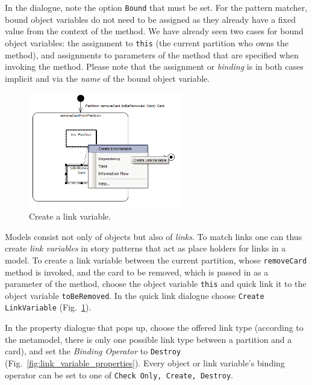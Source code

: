In the dialogue, note the option \texttt{Bound} that must be set.
For the pattern matcher, bound object variables do not need to be assigned as they already have a fixed value from the context of the method.  
We have already seen two cases  for bound object variables: the assignment to \texttt{this} (the current  partition who owns the method), and assignments to parameters of the 
method that  are specified when invoking the method.  
Please note that the assignment or \emph{binding} is in both cases implicit and via the \emph{name} of the bound object variable. 

\begin{figure}[htp]
\begin{center}
  \includegraphics[width=0.6\textwidth]{pics/sdmBilder/removeCard/sdm11RAW}
  \caption{Create a link variable.}   
  \label{fig:link_variable}
\end{center}
\end{figure}

Models consist not only of objects but also of \emph{links}.  
To match links one can thus create \emph{link variables} in story patterns that act as place 
holders for links in a model.  
To create a link variable between the current partition, whose \texttt{removeCard} method is invoked, and the card to be removed, which is passed in as a parameter of the method, choose the object variable \texttt{this} and quick link it to the object variable \texttt{toBeRemoved}.  
In the quick link dialogue choose \texttt{Create LinkVariable} (Fig.~\ref{fig:link_variable}).

In the property dialogue that pops up, choose the offered link type (according to the metamodel, there is only one possible link type between a partition and a 
card), and set the \emph{Binding Operator} to \texttt{Destroy} (Fig.~\ref{fig:link_variable_properties}). 
Every object or link variable's binding operator can be set to one of \texttt{Check Only, Create, Destroy}.

